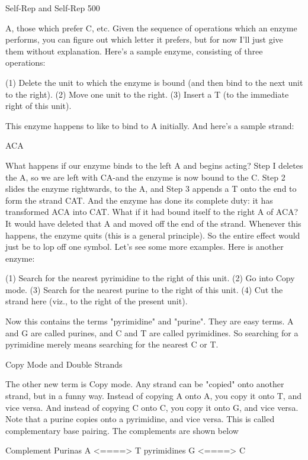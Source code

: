 {Self-Rep and Self-Rep                                                                      500

A, those which prefer C, etc. Given the sequence of operations which an enzyme performs,
you can figure out which letter it prefers, but for now I'll just give them without explanation.
Here's a sample enzyme, consisting of three operations:

   (1) Delete the unit to which the enzyme is bound (and then bind to the next unit to the
   right).
   (2) Move one unit to the right.
   (3) Insert a T (to the immediate right of this unit).

This enzyme happens to like to bind to A initially. And here's a sample strand:

                                               ACA

What happens if our enzyme binds to the left A and begins acting? Step I deletes the A, so we
are left with CA-and the enzyme is now bound to the C. Step 2 slides the enzyme rightwards,
to the A, and Step 3 appends a T onto the end to form the strand CAT. And the enzyme has
done its complete duty: it has transformed ACA into CAT.
         What if it had bound itself to the right A of ACA? It would have deleted that A and
moved off the end of the strand. Whenever this happens, the enzyme quits (this is a general
principle). So the entire effect would just be to lop off one symbol.
Let's see some more examples. Here is another enzyme:

   (1) Search for the nearest pyrimidine to the right of this unit.
   (2) Go into Copy mode.
   (3) Search for the nearest purine to the right of this unit.
   (4) Cut the strand here (viz., to the right of the present unit).

Now this contains the terms "pyrimidine" and "purine". They are easy terms. A and G are
called purines, and C and T are called pyrimidines. So searching for a pyrimidine merely
means searching for the nearest C or T.

                               Copy Mode and Double Strands

The other new term is Copy mode. Any strand can be "copied" onto another strand, but in a
funny way. Instead of copying A onto A, you copy it onto T, and vice versa. And instead of
copying C onto C, you copy it onto G, and vice versa. Note that a purine copies onto a
pyrimidine, and vice versa. This is called complementary base pairing. The complements are
shown below

               Complement
Purinas        A <====> T pyrimidines
               G <====> C




}
